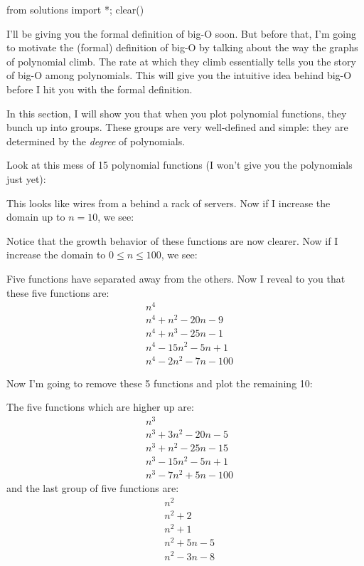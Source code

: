 \begin{python0}
from solutions import *; clear()
\end{python0}

I'll be giving you the formal definition of big-O soon.
But before that, I'm going to motivate the (formal) definition of big-O
by talking about the way the graphs of polynomial climb.
The rate at which they climb essentially tells you the story of big-O among 
polynomials.
This will give you the intuitive idea behind big-O before I hit you
with the formal definition.

In this section, I will show you that when you plot polynomial functions,
they bunch up into groups.
These groups are very well-defined and simple:
they are determined by the \textit{degree} of polynomials.

Look at this mess of 15 polynomial functions 
(I won't give you the polynomials just yet):


This looks like wires from a behind a rack of servers.
Now if I increase the domain up to $n = 10$, we see:


Notice that the growth behavior of these functions are now clearer.
Now if I increase the domain to $0 \leq n \leq 100$, we see:


Five functions have separated away from the others.
Now I reveal to you that these five functions are:
\begin{align*}
&n^4 \\
&n^4 + n^2 - 20n - 9 \\
&n^4 +  n^3 - 25n - 1 \\
&n^4 - 15n^2 - 5n + 1 \\
&n^4 - 2n^2 - 7n - 100
\end{align*}

Now I'm going to remove these 5 functions and plot the remaining 10:


The five functions which are higher up are:
\begin{align*}
&n^3 \\
&n^3 + 3n^2 - 20n - 5 \\
&n^3 +   n^2 - 25n - 15 \\
&n^3 - 15n^2 - 5n + 1 \\
&n^3 - 7n^2 + 5n - 100
\end{align*}
and the last group of five functions are:
\begin{align*}
&n^2 \\
&n^2 + 2 \\
&n^2 + 1 \\
&n^2 + 5n - 5 \\
&n^2 - 3n - 8
\end{align*}

